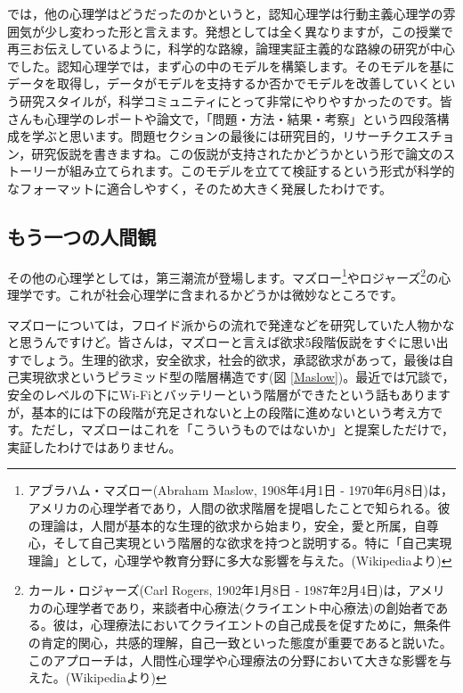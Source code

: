 \documentclass{ltjsbook}
\begin{document}
では，他の心理学はどうだったのかというと，認知心理学は行動主義心理学の雰囲気が少し変わった形と言えます。発想としては全く異なりますが，この授業で再三お伝えしているように，科学的な路線，論理実証主義的な路線の研究が中心でした。認知心理学では，まず心の中のモデルを構築します。そのモデルを基にデータを取得し，データがモデルを支持するか否かでモデルを改善していくという研究スタイルが，科学コミュニティにとって非常にやりやすかったのです。皆さんも心理学のレポートや論文で，「問題・方法・結果・考察」という四段落構成を学ぶと思います。問題セクションの最後には研究目的，リサーチクエスチョン，研究仮説を書きますね。この仮説が支持されたかどうかという形で論文のストーリーが組み立てられます。このモデルを立てて検証するという形式が科学的なフォーマットに適合しやすく，そのため大きく発展したわけです。

\subsection{もう一つの人間観}

その他の心理学としては，第三潮流が登場します。マズロー\footnote{アブラハム・マズロー(Abraham Maslow, 1908年4月1日 - 1970年6月8日)は，アメリカの心理学者であり，人間の欲求階層を提唱したことで知られる。彼の理論は，人間が基本的な生理的欲求から始まり，安全，愛と所属，自尊心，そして自己実現という階層的な欲求を持つと説明する。特に「自己実現理論」として，心理学や教育分野に多大な影響を与えた。(Wikipediaより)}やロジャーズ\footnote{カール・ロジャーズ(Carl Rogers, 1902年1月8日 - 1987年2月4日)は，アメリカの心理学者であり，来談者中心療法(クライエント中心療法)の創始者である。彼は，心理療法においてクライエントの自己成長を促すために，無条件の肯定的関心，共感的理解，自己一致といった態度が重要であると説いた。このアプローチは，人間性心理学や心理療法の分野において大きな影響を与えた。(Wikipediaより)}の心理学です。これが社会心理学に含まれるかどうかは微妙なところです。

マズローについては，フロイド派からの流れで発達などを研究していた人物かなと思うんですけど。皆さんは，マズローと言えば欲求5段階仮説をすぐに思い出すでしょう。生理的欲求，安全欲求，社会的欲求，承認欲求があって，最後は自己実現欲求というピラミッド型の階層構造です(図 \ref{Maslow})。最近では冗談で，安全のレベルの下にWi-Fiとバッテリーという階層ができたという話もありますが，基本的には下の段階が充足されないと上の段階に進めないという考え方です。ただし，マズローはこれを「こういうものではないか」と提案しただけで，実証したわけではありません。
\end{document}
